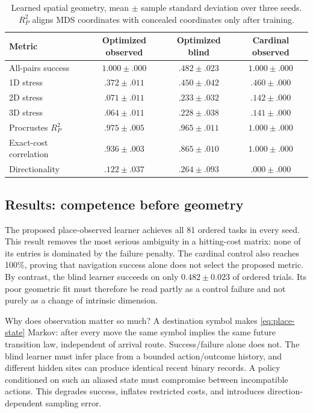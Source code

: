 \documentclass[11pt]{article}
\begin{document}
\begin{table}[t]
\centering
\caption{Learned spatial geometry, mean $\pm$ sample standard deviation over
three seeds. $R_P^2$ aligns MDS coordinates with concealed coordinates only
after training.}
\label{tab:spatial-results}
\small
\begin{tabular}{lccc}
\toprule
Metric & Optimized observed & Optimized blind & Cardinal observed\\
\midrule
All-pairs success & $1.000\pm.000$ & $.482\pm.023$ & $1.000\pm.000$\\
1D stress & $.372\pm.011$ & $.450\pm.042$ & $.460\pm.000$\\
2D stress & $\mathbf{.071\pm.011}$ & $.233\pm.032$ & $.142\pm.000$\\
3D stress & $.064\pm.011$ & $.228\pm.038$ & $.141\pm.000$\\
Procrustes $R_P^2$ & $.975\pm.005$ & $.965\pm.011$ & $1.000\pm.000$\\
Exact-cost correlation & $.936\pm.003$ & $.865\pm.010$ & $1.000\pm.000$\\
Directionality & $.122\pm.037$ & $.264\pm.093$ & $.000\pm.000$\\
\bottomrule
\end{tabular}
\end{table}

\subsection{Results: competence before geometry}

The proposed place-observed learner achieves all 81 ordered tasks in every
seed. This result removes the most serious ambiguity in a hitting-cost matrix:
none of its entries is dominated by the failure penalty. The cardinal control
also reaches 100\%, proving that navigation success alone does not select the
proposed metric. By contrast, the blind learner succeeds on only
$0.482\pm0.023$ of ordered trials. Its poor geometric fit must therefore be
read partly as a control failure and not purely as a change of intrinsic
dimension.

Why does observation matter so much? A destination symbol makes
\cref{eq:place-state} Markov: after every move the same symbol implies the same
future transition law, independent of arrival route. Success/failure alone
does not. The blind learner must infer place from a bounded action/outcome
history, and different hidden sites can produce identical recent binary
records. A policy conditioned on such an aliased state must compromise between
incompatible actions. This degrades success, inflates restricted costs, and
introduces direction-dependent sampling error.
\end{document}
